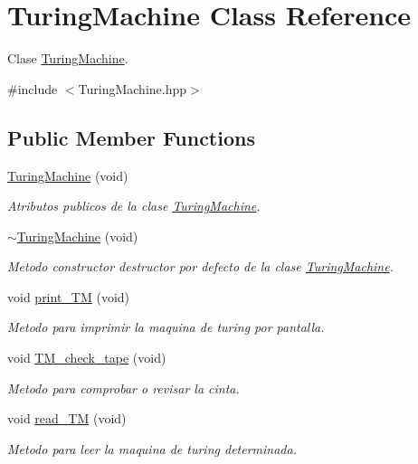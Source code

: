 \hypertarget{class_turing_machine}{}\section{Turing\+Machine Class Reference}
\label{class_turing_machine}


Clase \hyperlink{class_turing_machine}{Turing\+Machine}.  




{\ttfamily \#include $<$Turing\+Machine.\+hpp$>$}

\subsection*{Public Member Functions}
\begin{DoxyCompactItemize}
\item 
\hyperlink{class_turing_machine_a4b0fcfdedb6af49b88bd7a43ca17c530}{Turing\+Machine} (void)
\begin{DoxyCompactList}\small\item\em Atributos publicos de la clase \hyperlink{class_turing_machine}{Turing\+Machine}. \end{DoxyCompactList}\item 
\hypertarget{class_turing_machine_a43b0255fef717b891398e53aa055a9da}{}\label{class_turing_machine_a43b0255fef717b891398e53aa055a9da} 
\hyperlink{class_turing_machine_a43b0255fef717b891398e53aa055a9da}{$\sim$\+Turing\+Machine} (void)
\begin{DoxyCompactList}\small\item\em Metodo constructor destructor por defecto de la clase \hyperlink{class_turing_machine}{Turing\+Machine}. \end{DoxyCompactList}\item 
void \hyperlink{class_turing_machine_a3ef5de7d4213694b979969af00e12463}{print\+\_\+\+TM} (void)
\begin{DoxyCompactList}\small\item\em Metodo para imprimir la maquina de turing por pantalla. \end{DoxyCompactList}\item 
void \hyperlink{class_turing_machine_ae1ee7856691d4d40a62f2e380e9b87b1}{T\+M\+\_\+check\+\_\+tape} (void)
\begin{DoxyCompactList}\small\item\em Metodo para comprobar o revisar la cinta. \end{DoxyCompactList}\item 
void \hyperlink{class_turing_machine_a7fc1880eaabbe3cae9baccefd5ea5860}{read\+\_\+\+TM} (void)
\begin{DoxyCompactList}\small\item\em Metodo para leer la maquina de turing determinada. \end{DoxyCompactList}\end{DoxyCompactItemize}


